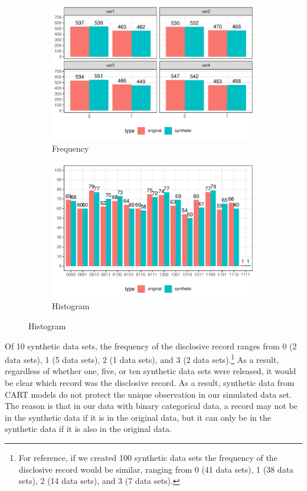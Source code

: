 \documentclass[runningheads]{llncs}
\begin{document}
\begin{figure}[!h]
    \centering
    \caption{Compare original and synthetic data}
    \begin{subfigure}{0.48\textwidth}
        \includegraphics[width=\textwidth]{../graphs/graph_cart_frequency_compare.pdf}
        \caption{Frequency}
        \label{fig:frequency_compare}
    \end{subfigure}
    \hfill
    \begin{subfigure}{0.48\textwidth}
        \includegraphics[width=\textwidth]{../graphs/graph_cart_histogram_compare.pdf}
        \caption{Histogram}
        \label{fig:histogram_compare}
    \end{subfigure}
    \label{fig:compare}
\end{figure}

Of 10 synthetic data sets, the frequency of the disclosive record ranges from 0 (2 data sets), 1 (5 data sets), 2 (1 data sets), and 3 (2 data sets).\footnote{For reference, if we created 100 synthetic data sets the frequency of the disclosive record would be similar, ranging from 0 (41 data sets), 1 (38 data sets), 2 (14 data sets), and 3 (7 data sets).}  As a result, regardless of whether one, five, or ten synthetic data sets were released, it would be clear which record was the disclosive record.  As a result, synthetic data from CART models do not protect the unique observation in our simulated data set.  The reason is that in our data with binary categorical data, a record may not be in the synthetic data if it is in the original data, but it can only be in the synthetic data if it is also in the original data.  
\end{document}

